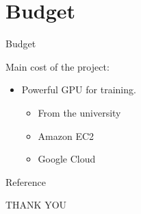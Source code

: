 \documentclass[11pt]{beamer}
\begin{document}
\section{Budget}
\begin{frame}{Budget} %

Main cost of the project: 
\begin{itemize}
	\item Powerful GPU for training. 
	\begin{itemize}
		\item From the university
		\item Amazon EC2
		\item Google Cloud
	\end{itemize}
\end{itemize}
\end{frame}

\begin{frame} [allowframebreaks] {Reference}%
	
	
	
\end{frame}

\begin{frame} %
\begin{center}
\LARGE
THANK YOU
\end{center}
\end{frame}
\end{document}
